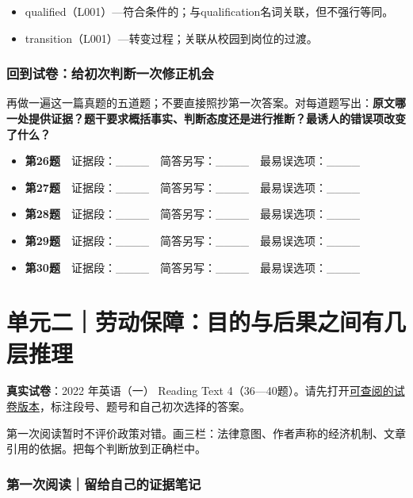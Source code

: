 \documentclass[
  11pt,
]{ctexart}
\begin{document}
\begin{itemize}
\item
  qualified（L001）---符合条件的；与qualification名词关联，但不强行等同。
\item
  transition（L001）---转变过程；关联从校园到岗位的过渡。
\end{itemize}

\subsubsection{回到试卷：给初次判断一次修正机会}\label{ux56deux5230ux8bd5ux5377ux7ed9ux521dux6b21ux5224ux65adux4e00ux6b21ux4feeux6b63ux673aux4f1a}

再做一遍这一篇真题的五道题；不要直接照抄第一次答案。对每道题写出：\textbf{原文哪一处提供证据？题干要求概括事实、判断态度还是进行推断？最诱人的错误项改变了什么？}

\begin{itemize}
\item
  \textbf{第26题}　证据段：\_\_\_\_　简答另写：\_\_\_\_　最易误选项：\_\_\_\_
\item
  \textbf{第27题}　证据段：\_\_\_\_　简答另写：\_\_\_\_　最易误选项：\_\_\_\_
\item
  \textbf{第28题}　证据段：\_\_\_\_　简答另写：\_\_\_\_　最易误选项：\_\_\_\_
\item
  \textbf{第29题}　证据段：\_\_\_\_　简答另写：\_\_\_\_　最易误选项：\_\_\_\_
\item
  \textbf{第30题}　证据段：\_\_\_\_　简答另写：\_\_\_\_　最易误选项：\_\_\_\_
\end{itemize}

\section{单元二｜劳动保障：目的与后果之间有几层推理}\label{ux5355ux5143ux4e8cux52b3ux52a8ux4fddux969cux76eeux7684ux4e0eux540eux679cux4e4bux95f4ux6709ux51e0ux5c42ux63a8ux7406}

\textbf{真实试卷}：2022 年英语（一） Reading Text
4（36---40题）。请先打开\href{https://ac-wiki.org/general-skills/study/assets/2022-201.pdf}{可查阅的试卷版本}，标注段号、题号和自己初次选择的答案。

第一次阅读暂时不评价政策对错。画三栏：法律意图、作者声称的经济机制、文章引用的依据。把每个判断放到正确栏中。

\subsubsection{第一次阅读｜留给自己的证据笔记}\label{ux7b2cux4e00ux6b21ux9605ux8bfbux7559ux7ed9ux81eaux5df1ux7684ux8bc1ux636eux7b14ux8bb0-1}
\end{document}
